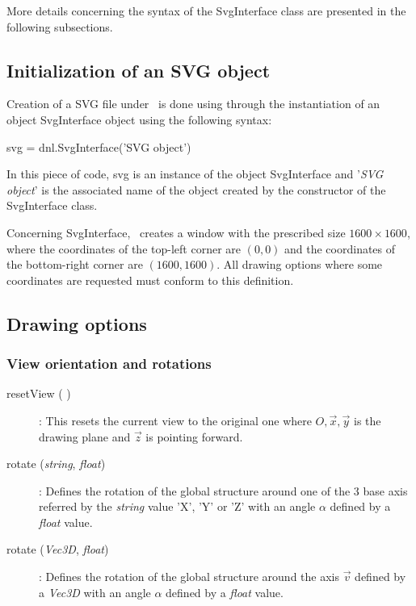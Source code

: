 More details concerning the syntax of the SvgInterface class are presented in the following subsections.

\subsection{Initialization of an SVG object}
Creation of a SVG file under \DynELA~is done using through the instantiation of an object \textsf{SvgInterface} object using the following syntax:
\begin{PythonListing}
svg = dnl.SvgInterface('SVG object')
\end{PythonListing}
In this piece of code, \textsf{svg} is an instance of the object \textsf{SvgInterface} and '\emph{SVG object}' is the associated name of the object created by the constructor of the \textsf{SvgInterface} class.

Concerning \textsf{SvgInterface}, \DynELA~creates a window with the prescribed size $1600\times1600$, where the coordinates of the top-left corner are $(0, 0)$ and the coordinates of the bottom-right corner are $(1600, 1600)$. All drawing options where some coordinates are requested must conform to this definition.

\subsection{Drawing options}

\subsubsection{View orientation and rotations}
\begin{description}
\item [{resetView ( )}] : This resets the current view to the original one where $O,\overrightarrow{x},\overrightarrow{y}$ is the drawing plane and $\overrightarrow{z}$ is pointing forward.
\item [{rotate (\emph{string}, \emph{float})}] : Defines the rotation of the global structure around one of the $3$ base axis referred by the \emph{string} value 'X', 'Y' or 'Z' with an angle $\alpha$ defined by a \emph{float} value.
\item [{rotate (\emph{Vec3D}, \emph{float})}] : Defines the rotation of the global structure around the axis $\overrightarrow{v}$ defined by a \emph{Vec3D} with an angle $\alpha$ defined by a \emph{float} value.
\end{description}

